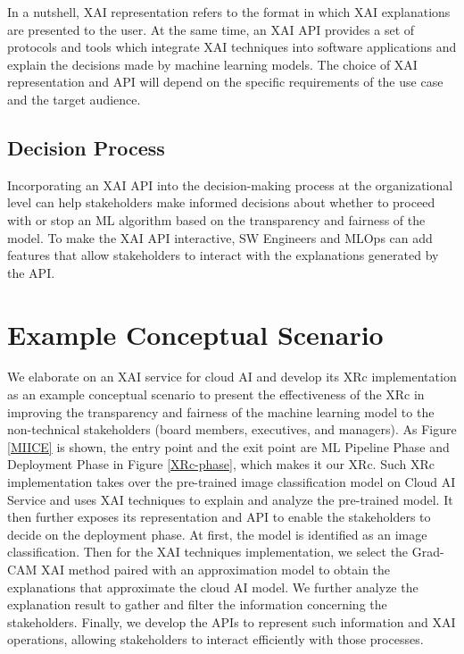 \documentclass[conference]{IEEEtran}
\begin{document}
In a nutshell, XAI representation refers to the format in which XAI explanations are presented to the user. At the same time, an XAI API provides a set of protocols and tools which integrate XAI techniques into software applications and explain the decisions made by machine learning models. The choice of XAI representation and API will depend on the specific requirements of the use case and the target audience.

\subsection{Decision Process}
Incorporating an XAI API into the decision-making process at the organizational level can help stakeholders make informed decisions about whether to proceed with or stop an ML algorithm based on the transparency and fairness of the model. To make the XAI API interactive, SW Engineers and MLOps can add features that allow stakeholders to interact with the explanations generated by the API.

\section{Example Conceptual Scenario}

We elaborate on an XAI service for cloud AI and develop its XRc implementation as an example conceptual scenario to present the effectiveness of the XRc in improving the transparency and fairness of the machine learning model to the non-technical stakeholders (board members, executives, and managers).
As Figure \ref{MIICE} is shown, the entry point and the exit point are ML Pipeline Phase and Deployment Phase in Figure \ref{XRc-phase}, which makes it our XRc. Such XRc implementation takes over the pre-trained image classification model on Cloud AI Service and uses XAI techniques to explain and analyze the pre-trained model. It then further exposes its representation and API to enable the stakeholders to decide on the deployment phase. At first, the model is identified as an image classification. Then for the XAI techniques implementation, we select the Grad-CAM XAI method paired with an approximation model to obtain the explanations that approximate the cloud AI model. We further analyze the explanation result to gather and filter the information concerning the stakeholders. Finally, we develop the APIs to represent such information and XAI operations, allowing stakeholders to interact efficiently with those processes.
\end{document}
